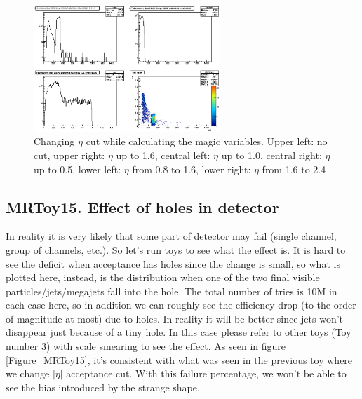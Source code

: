\documentclass{fheadnote}
\begin{document}
\begin{figure}[htbp]
   \includegraphics[width=7cm]{Figures/MRToy14_Endcap}
   \caption{Changing $\eta$ cut while calculating the magic variables.  Upper left: no cut, upper right: $\eta$ up to 1.6, central left: $\eta$ up to 1.0,
   central right: $\eta$ up to 0.5, lower left: $\eta$ from 0.8 to 1.6, lower right: $\eta$ from 1.6 to 2.4}
   \label{Figure_MRToy14}
\end{figure}

\subsection{MRToy15.  Effect of holes in detector}

In reality it is very likely that some part of detector may fail (single channel, group of channels, etc.).
So let's run toys to see what the effect is.
It is hard to see the deficit when acceptance has holes since the change is small, so what is plotted here, instead, is the distribution
when one of the two final visible particles/jets/megajets fall into the hole.
The total number of tries is 10M in each case here, so in addition we can roughly see the efficiency drop (to the order of magnitude at most)
due to holes.  In reality it will be better since jets won't disappear just because of a tiny hole.  In this case please refer to other toys (Toy number 3)
with scale smearing to see the effect.
As seen in figure \ref{Figure_MRToy15}, it's consistent with what was seen in the previous toy where we change $|\eta|$ acceptance cut.
With this failure percentage, we won't be able to see the bias introduced by the strange shape.
\end{document}
